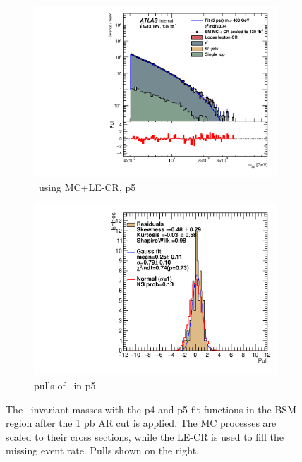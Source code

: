 \begin{figure}[ht]
\begin{subfigure}[h]{0.38\linewidth}
    \includegraphics[scale=0.3]{figs/ch6/fit/variable_nosmooth/p5/1PB/output_SMMCplusCR_Mbb_p5.pdf}%
     \caption{\mbb \ using MC+LE-CR, p5}
     \end{subfigure}
     \hfill
    \begin{subfigure}[h]{0.4\linewidth}
    \includegraphics[scale=0.32]{figs/ch6/fit/variable_nosmooth/p5/1PB/pull_SMMCplusCR_Mbb_p5.pdf}%
    \caption{pulls of \mbb \ in p5}
    \end{subfigure}
    \caption{The \mbb \ invariant masses with the p4 and p5 fit functions in the BSM region after the 1 pb AR cut is applied. The MC processes are scaled to their cross sections, while the LE-CR is used to fill the missing event rate. Pulls shown on the right.}
\label{fig:mbb-fit-pulls-1pb}
\end{figure}


